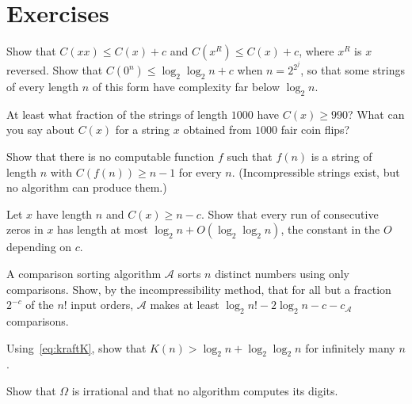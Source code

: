 \section{Exercises}

\begin{exercise}[$\star$]\label{ex:basicC}
Show that $C(xx)\le C(x)+c$ and $C(x^R)\le C(x)+c$, where $x^R$ is $x$ reversed. Show that $C(0^n)\le\log_2\log_2n+c$ when $n=2^{2^j}$, so that some strings of every length $n$ of this form have complexity far below $\log_2n$.
\end{exercise}

\begin{exercise}[$\star$]\label{ex:fraction}
At least what fraction of the strings of length $1000$ have $C(x)\ge990$? What can you say about $C(x)$ for a string $x$ obtained from $1000$ fair coin flips?
\end{exercise}

\begin{exercise}[$\star$]\label{ex:produce}
Show that there is no computable function $f$ such that $f(n)$ is a string of length $n$ with $C(f(n))\ge n-1$ for every $n$. (Incompressible strings exist, but no algorithm can produce them.)
\end{exercise}

\begin{exercise}[$\star\star$]\label{ex:runs}
Let $x$ have length $n$ and $C(x)\ge n-c$. Show that every run of consecutive zeros in $x$ has length at most $\log_2n+O(\log_2\log_2n)$, the constant in the $O$ depending on $c$.
\end{exercise}

\begin{exercise}[$\star\star$]\label{ex:compsort}
A comparison sorting algorithm $\mathcal A$ sorts $n$ distinct numbers using only comparisons. Show, by the incompressibility method, that for all but a fraction $2^{-c}$ of the $n!$ input orders, $\mathcal A$ makes at least $\log_2n!-2\log_2n-c-c_{\mathcal A}$ comparisons.
\end{exercise}

\begin{exercise}[$\star\star$]\label{ex:Kn}
Using~\eqref{eq:kraftK}, show that $K(n)>\log_2n+\log_2\log_2n$ for infinitely many $n$.
\end{exercise}

\begin{exercise}[$\star$]\label{ex:omegairr}
Show that $\Omega$ is irrational and that no algorithm computes its digits.
\end{exercise}

